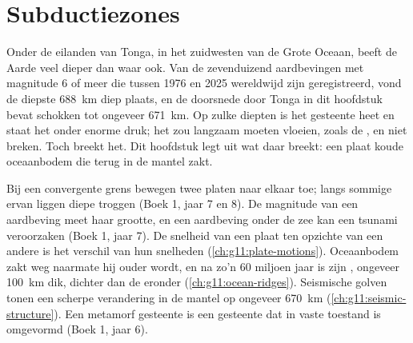 \chapter{Subductiezones}\label{ch:g11:subduction-zones}

Onder de eilanden van Tonga, in het zuidwesten van de Grote Oceaan, beeft de Aarde
veel dieper dan waar ook. Van de zevenduizend aardbevingen met magnitude
6 of meer die tussen 1976 en 2025 wereldwijd zijn geregistreerd, vond de diepste
\qty{688}{km} diep plaats, en de doorsnede door Tonga in dit hoofdstuk bevat schokken tot
ongeveer \qty{671}{km}. Op zulke diepten is het gesteente heet en staat het onder enorme
druk; het zou langzaam moeten vloeien, zoals de , en niet breken. Toch
breekt het. Dit hoofdstuk legt uit wat daar breekt: een plaat koude oceaanbodem
die terug in de mantel zakt.

\begin{recall}
Bij een convergente grens bewegen twee platen naar elkaar toe; langs sommige
ervan liggen diepe troggen (Boek 1, jaar 7 en 8). De magnitude van een aardbeving
meet haar grootte, en een aardbeving onder de zee kan een tsunami veroorzaken
(Boek 1, jaar 7). De snelheid van een plaat ten opzichte van een andere is het
verschil van hun snelheden (\cref{ch:g11:plate-motions}). Oceaanbodem
zakt weg naarmate hij ouder wordt, en na zo'n 60 miljoen jaar is zijn , ongeveer
\qty{100}{km} dik, dichter dan de  eronder
(\cref{ch:g11:ocean-ridges}). Seismische golven tonen een scherpe verandering in de
mantel op ongeveer \qty{670}{km} (\cref{ch:g11:seismic-structure}). Een metamorf
gesteente is een gesteente dat in vaste toestand is omgevormd (Boek 1, jaar 6).
\end{recall}

